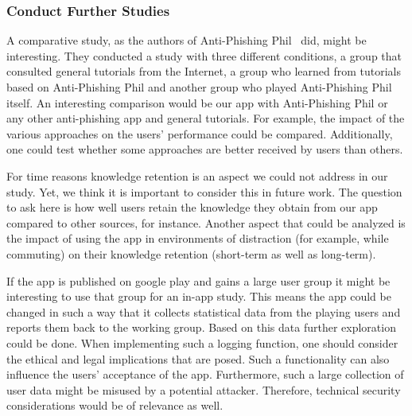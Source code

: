\subsubsection{Conduct Further Studies}
\begin{description}[leftmargin=0cm]
	\item[Comparative Study:] A comparative study, as the authors of Anti-Phishing Phil~\cite{sheng2007antiphishingphil} did, might be interesting.
	They conducted a study with three different conditions, a group that consulted general tutorials from the Internet, a  group who learned from tutorials based on Anti-Phishing Phil and another group who played Anti-Phishing Phil itself.
	An interesting comparison would be our app with Anti-Phishing Phil or any other anti-phishing app and general tutorials.
For example, the impact of the various approaches on the users' performance could be compared.
Additionally, one could test whether some approaches are better received by users than others.
	\item[Study on Retention:] For time reasons knowledge retention is an aspect we could not address in our study.
	Yet, we think it is important to consider this in future work.
	The question to ask here is how well users retain the knowledge they obtain from our app compared to other sources, for instance.
	Another aspect that could be analyzed is the impact of using the app in environments of distraction (for example, while commuting) on their knowledge retention (short-term as well as long-term).
	\item[In-App Statistics:] If the app is published on google play and gains a large user group it might be interesting to use that group for an in-app study. This means the app could be changed in such a way that it collects statistical data from the playing users and reports them back to the working group. Based on this data further exploration could be done. When implementing such a logging function, one should consider the ethical and legal implications that are posed. Such a functionality can also influence the users' acceptance of the app. Furthermore, such a large collection of user data might be misused by a potential attacker. Therefore, technical security considerations would be of relevance as well.
\end{description}

